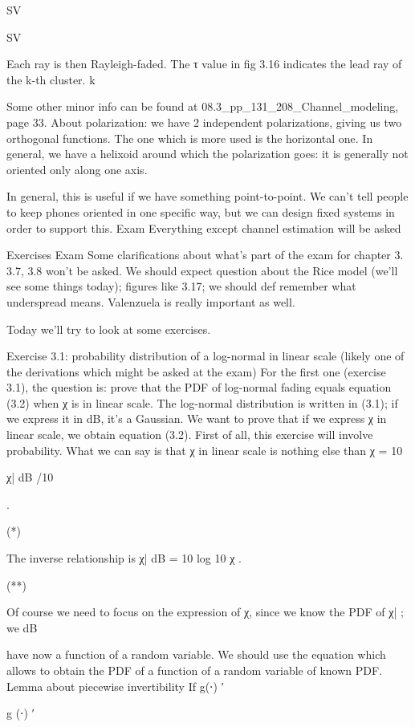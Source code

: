 {{{{SV

SV

Each ray is then Rayleigh-faded.
The τ value in fig 3.16 indicates the lead ray of the k-th cluster.
k

Some other minor info can be found at 08.3_pp_131_208_Channel_modeling, page 33.
About polarization: we have 2 independent polarizations, giving us two orthogonal functions. The one which is more used is the horizontal one. In general, we have a helixoid around which the polarization goes: it is generally not oriented only along one axis.

In general, this is useful if we have something point-to-point. We can't tell people to keep phones oriented in one specific way, but we can design fixed systems in order to support this.
Exam Everything except channel estimation will be asked

Exercises Exam Some clarifications about what's part of the exam for chapter 3.
3.7, 3.8 won't be asked.
We should expect question about the Rice model (we'll see some things today);
figures like 3.17; we should def remember what underspread means.
Valenzuela is really important as well.

Today we'll try to look at some exercises.

Exercise 3.1: probability distribution of a log-normal in linear scale (likely one of the derivations which might be asked at the exam)
For the first one (exercise 3.1), the question is: prove that the PDF of log-normal fading equals equation (3.2) when χ is in linear scale.
The log-normal distribution is written in (3.1); if we express it in dB, it's a Gaussian. We want to prove that if we express χ in linear scale, we obtain equation (3.2).
First of all, this exercise will involve probability. What we can say is that χ in linear scale is nothing else than χ = 10

χ| dB /10

.

(*)

The inverse relationship is χ| dB = 10 log 10 χ .

(**)

Of course we need to focus on the expression of χ, since we know the PDF of χ| ; we dB

have now a function of a random variable. We should use the equation which allows to obtain the PDF of a function of a random variable of known PDF.
Lemma about piecewise invertibility If g(⋅)
′

g (⋅)
′

}}}}
